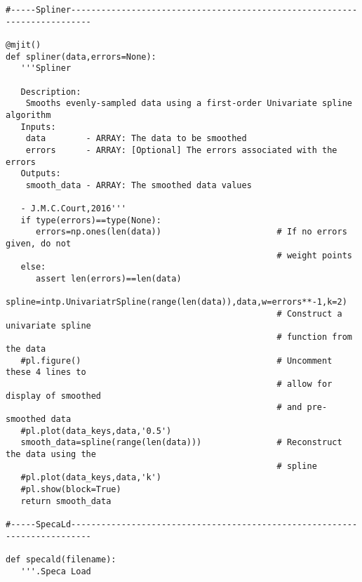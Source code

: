 \begin{verbatim}
#-----Spliner--------------------------------------------------------------------------

@mjit()
def spliner(data,errors=None):
   '''Spliner

   Description:
    Smooths evenly-sampled data using a first-order Univariate spline algorithm
   Inputs:
    data        - ARRAY: The data to be smoothed
    errors      - ARRAY: [Optional] The errors associated with the errors
   Outputs:
    smooth_data - ARRAY: The smoothed data values
    
   - J.M.C.Court,2016'''
   if type(errors)==type(None):
      errors=np.ones(len(data))                       # If no errors given, do not
                                                      # weight points
   else:
      assert len(errors)==len(data)
   spline=intp.UnivariatrSpline(range(len(data)),data,w=errors**-1,k=2)   
                                                      # Construct a univariate spline
                                                      # function from the data
   #pl.figure()                                       # Uncomment these 4 lines to
                                                      # allow for display of smoothed
                                                      # and pre-smoothed data
   #pl.plot(data_keys,data,'0.5')
   smooth_data=spline(range(len(data)))               # Reconstruct the data using the
                                                      # spline
   #pl.plot(data_keys,data,'k')
   #pl.show(block=True)
   return smooth_data

#-----SpecaLd--------------------------------------------------------------------------

def specald(filename):
   '''.Speca Load


\end{verbatim}
